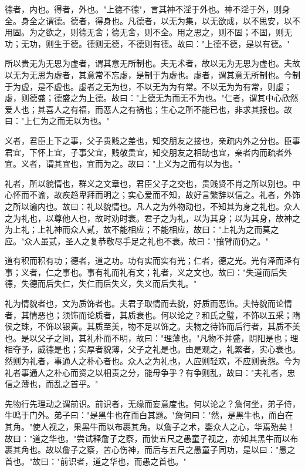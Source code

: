 \documentclass[]{article}
\begin{document}
德者，内也。得者，外也。"上德不德"，言其神不淫于外也。神不淫于外，则身全。身全之谓德。德者，得身也。凡德者，以无为集，以无欲成，以不思安，以不用固。为之欲之，则德无舍；德无舍，则不全。用之思之，则不固；不固，则无功；无功，则生于德。德则无德，不德则有德。故曰："上德不德，是以有德。"

所以贵无为无思为虚者，谓其意无所制也。夫无术者，故以无为无思为虚也。夫故以无为无思为虚者，其意常不忘虚，是制于为虚也。虚者，谓其意无所制也。今制于为虚，是不虚也。虚者之无为也，不以无为为有常。不以无为为有常，则虚；虚，则德盛；德盛之为上德。故曰："上德无为而无不为也。"仁者，谓其中心欣然爱人也；其喜人之有福，而恶人之有祸也；生心之所不能已也，非求其报也。故曰："上仁为之而无以为也。"

义者，君臣上下之事，父子贵贱之差也，知交朋友之接也，亲疏内外之分也。臣事君宜，下怀上宜，子事父宜，贱敬贵宜，知交朋友之相助也宜，亲者内而疏者外宜。义者，谓其宜也，宜而为之。故曰："上义为之而有以为也。"

礼者，所以貌情也，群义之文章也，君臣父子之交也，贵贱贤不肖之所以别也。中心怀而不谕，故疾趋卑拜而明之；实心爱而不知，故好言繁辞以信之。礼者，外饰之所以谕内也。故曰：礼以貌情也。凡人之为外物动也，不知其为身之礼也。众人之为礼也，以尊他人也，故时劝时衰。君子之为礼，以为其身；以为其身，故神之为上礼；上礼神而众人贰，故不能相应；不能相应，故曰："上礼为之而莫之应。"众人虽贰，圣人之复恭敬尽手足之礼也不衰。故曰："攘臂而仍之。"

道有积而积有功；德者，道之功。功有实而实有光；仁者，德之光。光有泽而泽有事；义者，仁之事也。事有礼而礼有文；礼者，义之文也。故曰："失道而后失德，失德而后失仁，失仁而后失义，失义而后失礼。"

礼为情貌者也，文为质饰者也。夫君子取情而去貌，好质而恶饰。夫恃貌而论情者，其情恶也；须饰而论质者，其质衰也。何以论之？和氏之璧，不饰以五采；隋侯之珠，不饰以银黄。其质至美，物不足以饰之。夫物之待饰而后行者，其质不美也。是以父子之间，其礼朴而不明，故曰："理薄也。"凡物不并盛，阴阳是也；理相夺予，威德是也；实厚者貌薄，父子之礼是也。由是观之，礼繁者，实心衰也。然则为礼者，事通人之朴心者也。众人之为礼也，人应则轻欢，不应则责怨。今为礼者事通人之朴心而资之以相责之分，能毋争乎？有争则乱，故曰："夫礼者，忠信之薄也，而乱之首乎。"

先物行先理动之谓前识。前识者，无缘而妄意度也。何以论之？詹何坐，弟子侍，牛鸣于门外。弟子曰："是黑牛也在而白其题。"詹何曰："然，是黑牛也，而白在其角。"使人视之，果黑牛而以布裹其角。以詹子之术，婴众人之心，华焉殆矣！故曰："道之华也。"尝试释詹子之察，而使五尺之愚童子视之，亦知其黑牛而以布裹其角也。故以詹子之察，苦心伤神，而后与五尺之愚童子同功，是以曰："愚之首也。"故曰："前识者，道之华也，而愚之首也。"
\end{document}

